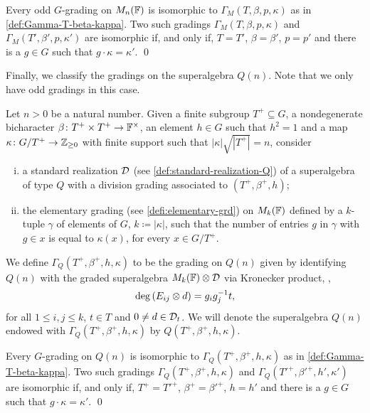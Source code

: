 \begin{cor}\label{cor:iso-M-odd}
    Every odd $G$-grading on $M_n(\mathbb{F})$ is isomorphic to $\Gamma_M (T, \beta, p, \kappa)$ as in \cref{def:Gamma-T-beta-kappa}. 
    Two such gradings $\Gamma_M (T, \beta, p, \kappa)$ and $\Gamma_M (T', \beta', p, \kappa')$ are isomorphic if, and only if, $T = T'$, $\beta = \beta'$, $p = p'$ and there is a $g\in G$ such that $g\cdot \kappa = \kappa'$. \qed
\end{cor}


Finally, we classify the gradings on the superalgebra $Q(n)$. 
Note that we only have odd gradings in this case. 


\begin{defi}\label{def:Gamma-T-beta-kappa-Q}
    Let $n > 0$ be a natural number. 
    Given a finite subgroup $T^+ \subseteq G$, a nondegenerate bicharacter $\beta\colon T^+ \times T^+ \to \mathbb{F}^\times$, an element $h\in G$ such that $h^2 = 1$ and a map $\kappa\colon G/T^+ \to \mathbb{Z}_{\geq 0}$ with finite support such that $|\kappa| \sqrt{|T^+|} = n$, consider 
    \begin{enumerate}[(i)]
        \item a standard realization $\mathcal{D}$ (see \cref{def:standard-realization-Q}) of a superalgebra of type $Q$ with a division grading associated to $(T^+, \beta^+, h)$;
        \item the elementary grading (see \cref{defi:elementary-grd}) on $M_{k}(\mathbb{F})$ defined by a $k$-tuple $\gamma$ 
        of elements of $G$, $k \coloneqq |\kappa|$, such that the number of entries $g$ in $\gamma$ with $g\in x$ is equal to $\kappa (x)$, for every $x\in G/T^+$.  
    \end{enumerate}
    We define $\Gamma_Q (T^+, \beta^+, h, \kappa)$ to be the grading on $Q(n)$ given by identifying $Q(n)$ with the graded superalgebra $M_k(\mathbb{F}) \otimes \mathcal{D}$ via Kronecker product, \ie,
    \[
        \deg \left( E_{ij} \otimes d \right) = g_ig_j^{-1} t,
    \] 
    for all $1\leq i, j \leq k$, $t\in T$ and $0 \neq d \in \mathcal{D}_t$. 
    We will denote the superalgebra $Q(n)$ endowed with $\Gamma_Q (T^+, \beta^+, h, \kappa)$ by $Q (T^+, \beta^+, h, \kappa)$. 
\end{defi}

\begin{cor}\label{cor:iso-Q}
    Every $G$-grading on $Q(n)$ is isomorphic to $\Gamma_Q (T^+, \beta^+, h, \kappa)$ as in \cref{def:Gamma-T-beta-kappa}. 
    Two such gradings $\Gamma_Q (T^+, \beta^+, h, \kappa)$ and $\Gamma_Q (T'^+, \beta'^+, h', \kappa')$ are isomorphic if, and only if, $T^+ = T'^+$, $\beta^+ = \beta'^+$, $h = h'$ and there is a $g\in G$ such that $g\cdot \kappa = \kappa'$. \qed
\end{cor}